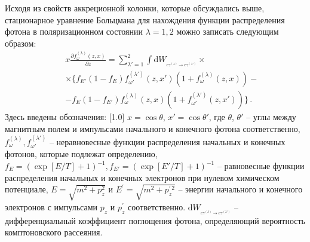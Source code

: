 \documentclass{pazh2col-win}
\newcommand{\dd}{\mathrm{d}} %
\begin{document}
Исходя из свойств аккреционной колонки, которые обсуждались выше, стационарное уравнение Больцмана для нахождения функции распределения фотона в поляризационном состоянии $\lambda=1,2$ можно записать следующим образом:
%
\begin{eqnarray}
\label{Kineq:Gen}
\nonumber
&&x\frac{\partial f^{(\lambda)}_\omega(z,x)}{\partial z}=\sum\limits_{\lambda'=1}^{2} 
\int \dd W_{_{e\gamma^{(\lambda)} \to e\gamma^{(\lambda')} }} \times
\\
\nonumber
&&\times\{f_{E'}(1-f_E)f^{(\lambda')}_{\omega'}(z, x') (1+f_\omega^{(\lambda)}(z, x))-
\\
&&-f_E (1-f_{E'}) f_\omega^{(\lambda)}(z,x)(1+f_{\omega'}^{(\lambda')}(z, x'))\}\, .
\end{eqnarray}
%
Здесь введены обозначения: \scalebox{1}[1.0]{ $x=\cos\theta$, $x'=\cos\theta'$}, где $\theta$, $\theta'$ -- углы между магнитным полем и импульсами начального и конечного фотона соответственно, $f_\omega^{(\lambda)}, f_{\omega'}^{(\lambda')}$ -- неравновесные функции распределения начальных и конечных фотонов, которые подлежат определению,\linebreak $f_E=(\exp[E/T]+1)^{-1}, f_{E'}=(\exp[E'/T]+1)^{-1}$ \linebreak -- равновесные функции распределения начальных и конечных электронов при нулевом химическом потенциале, $E = \sqrt{m^2+p_z^2}$ и $E^{\prime} = \sqrt{m^2+p^{\prime \, 2}_z}$ -- энергии начального и конечного электронов с импульсами $p_z$ и $p^{\prime}_z$ соответственно. \linebreak $\dd W_{_{e\gamma^{(\lambda)} \to e\gamma^{(\lambda')} }}$ --  дифференциальный коэффициент поглощения фотона, определяющий вероятность комптоновского рассеяния.
\end{document}

